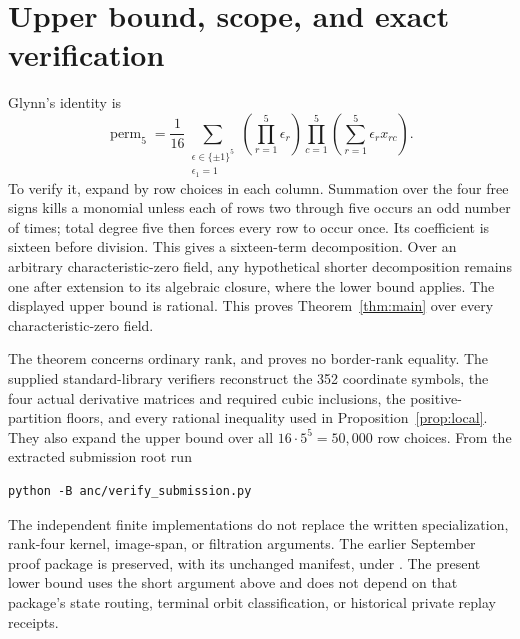 \documentclass[11pt]{amsart}
\theoremstyle{definition}
\numberwithin{equation}{section}
\newcommand{\perm}{\operatorname{perm}}
\begin{document}
\section{Upper bound, scope, and exact verification}
Glynn's identity \cite{Glynn2010} is
\[
 \perm_5=\frac1{16}
 \sum_{\substack{\epsilon\in\{\pm1\}^5\\\epsilon_1=1}}
 \left(\prod_{r=1}^5\epsilon_r\right)
 \prod_{c=1}^5\left(\sum_{r=1}^5\epsilon_rx_{rc}\right).
\]
To verify it, expand by row choices in each column. Summation over the four
free signs kills a monomial unless each of rows two through five occurs an
odd number of times; total degree five then forces every row to occur once.
Its coefficient is sixteen before division. This gives a sixteen-term
decomposition. Over an arbitrary characteristic-zero field, any hypothetical
shorter decomposition remains one after extension to its algebraic closure,
where the lower bound applies. The displayed upper bound is rational.
This proves Theorem~\ref{thm:main} over every characteristic-zero field.

The theorem concerns ordinary rank, and proves no border-rank equality.
The supplied standard-library verifiers reconstruct the 352 coordinate
symbols, the four actual derivative matrices and required cubic inclusions,
the positive-partition floors, and every rational inequality used in
Proposition~\ref{prop:local}. They also expand the upper bound over all
\(16\cdot5^5=50{,}000\) row choices. From the extracted submission root run
\begin{verbatim}
python -B anc/verify_submission.py
\end{verbatim}
The independent finite implementations do not replace the written
specialization, rank-four kernel, image-span, or filtration arguments.
The earlier September proof package is preserved, with its unchanged
manifest, under . The present lower bound uses the
short argument above and does not depend on that package's state routing,
terminal orbit classification, or historical private replay receipts.

\appendix
\end{document}
